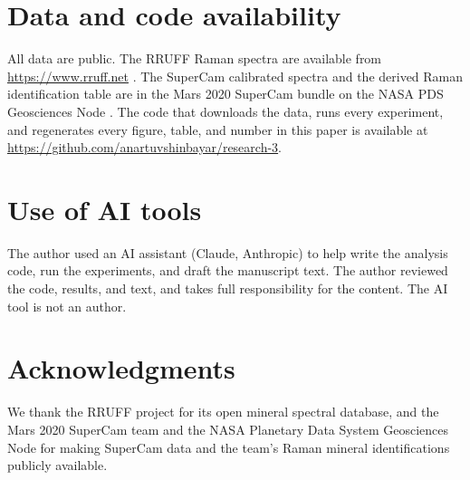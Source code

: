 \section*{Data and code availability}
All data are public. The RRUFF Raman spectra are available from \url{https://www.rruff.net} \citep{lafuente2015rruff}. The SuperCam calibrated spectra and the derived Raman identification table are in the Mars 2020 SuperCam bundle on the NASA PDS Geosciences Node \citep{wiens2021supercambundle}. The code that downloads the data, runs every experiment, and regenerates every figure, table, and number in this paper is available at \url{https://github.com/anartuvshinbayar/research-3}.

\section*{Use of AI tools}
The author used an AI assistant (Claude, Anthropic) to help write the analysis code, run the experiments, and draft the manuscript text. The author reviewed the code, results, and text, and takes full responsibility for the content. The AI tool is not an author.

\section*{Acknowledgments}
We thank the RRUFF project for its open mineral spectral database, and the Mars 2020 SuperCam team and the NASA Planetary Data System Geosciences Node for making SuperCam data and the team's Raman mineral identifications publicly available.
